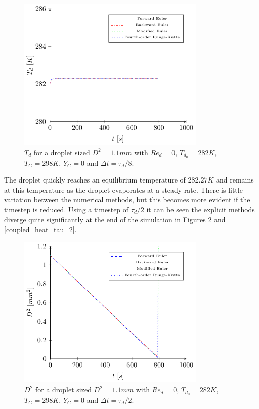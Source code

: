 \documentclass[../Interim_Report_Master]{subfiles}
\begin{document}
\begin{figure}[H]
	\centering
	\includegraphics[width=0.8\textwidth]{./Diagrams/Coupled_Heat_Mass_Transfer_tau_8/Coupled_Heat_Transfer_tau_8.pdf}
	\caption{$T_d$ for a droplet sized $D^2=1.1mm$ with $Re_d=0$, $T_{d_0}=282K$, $T_G=298K$, $Y_G=0$ and $\Delta t=\tau_d/8$.}
	\label{coupled_heat_tau_8}
\end{figure}

The droplet quickly reaches an equilibrium temperature of $282.27K$ and remains at this temperature as the droplet evaporates at a steady rate. There is little variation between the numerical methods, but this becomes more evident if the timestep is reduced. Using a timestep of $\tau_d/2$ it can be seen the explicit methods diverge quite significantly at the end of the simulation in Figures \ref{coupled_d2_tau_2} and \ref{coupled_heat_tau_2}. 

\begin{figure}[H]
	\centering
	\includegraphics[width=0.8\textwidth]{./Diagrams/Coupled_Heat_Mass_Transfer_tau_2/Coupled_d2_Transfer_tau_2.pdf}
	\caption{$D^2$ for a droplet sized $D^2=1.1mm$ with $Re_d=0$, $T_{d_0}=282K$, $T_G=298K$, $Y_G=0$ and $\Delta t=\tau_d/2$.}
	\label{coupled_d2_tau_2}
\end{figure}
\end{document}
